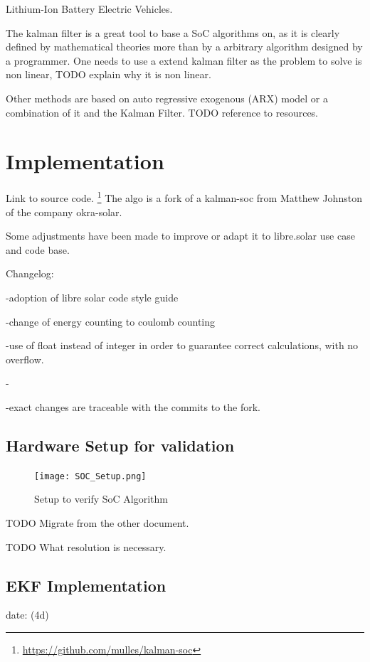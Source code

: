 Lithium-Ion Battery Electric Vehicles.

The kalman filter is a great tool to base a SoC algorithms on, as it is clearly defined by mathematical theories more than by a arbitrary algorithm designed by a programmer. One needs to use a extend kalman filter as the problem to solve is non linear, TODO explain why it is non linear. 

Other methods are based on auto regressive exogenous (ARX) model or a combination of it and the Kalman Filter. TODO reference to resources.

\chapter{Implementation}





Link to source code. \footnote{ \url{https://github.com/mulles/kalman-soc} } The algo is a fork of a kalman-soc from  Matthew Johnston of the company okra-solar. 

Some adjustments have been made to improve or adapt it to libre.solar use case and code base. 



Changelog: 



-adoption of libre solar code style guide 

-change of energy counting to coulomb counting

-use of float instead of integer in order to guarantee correct calculations, with no overflow. 

-

-exact changes are traceable with the commits to the fork. 



\section{Hardware Setup for validation}

\begin{figure}[!ht]
\texttt{[image: SOC\_Setup.png]}
\caption{\label{fig:SoCSetup} Setup to verify SoC Algorithm}
\end{figure}



TODO Migrate from the other document.

TODO What resolution is necessary. 

\section{EKF Implementation}
date: (4d)

